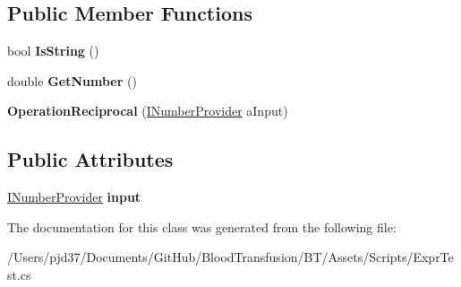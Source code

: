 \subsection*{Public Member Functions}
\begin{DoxyCompactItemize}
\item 
bool {\bfseries Is\+String} ()\hypertarget{class_b83_1_1_logic_expression_parser_1_1_operation_reciprocal_a662ac9f17e951142640d7c84fb229de4}{}\label{class_b83_1_1_logic_expression_parser_1_1_operation_reciprocal_a662ac9f17e951142640d7c84fb229de4}

\item 
double {\bfseries Get\+Number} ()\hypertarget{class_b83_1_1_logic_expression_parser_1_1_operation_reciprocal_afc390a8d14c3cad735f3baf014ab6cf5}{}\label{class_b83_1_1_logic_expression_parser_1_1_operation_reciprocal_afc390a8d14c3cad735f3baf014ab6cf5}

\item 
{\bfseries Operation\+Reciprocal} (\hyperlink{interface_b83_1_1_logic_expression_parser_1_1_i_number_provider}{I\+Number\+Provider} a\+Input)\hypertarget{class_b83_1_1_logic_expression_parser_1_1_operation_reciprocal_a2c6a5228f2d8d9b0f4e71947c413fb9f}{}\label{class_b83_1_1_logic_expression_parser_1_1_operation_reciprocal_a2c6a5228f2d8d9b0f4e71947c413fb9f}

\end{DoxyCompactItemize}
\subsection*{Public Attributes}
\begin{DoxyCompactItemize}
\item 
\hyperlink{interface_b83_1_1_logic_expression_parser_1_1_i_number_provider}{I\+Number\+Provider} {\bfseries input}\hypertarget{class_b83_1_1_logic_expression_parser_1_1_operation_reciprocal_a8c1b6f5ffd6f2228fcf0e63254cfb94a}{}\label{class_b83_1_1_logic_expression_parser_1_1_operation_reciprocal_a8c1b6f5ffd6f2228fcf0e63254cfb94a}

\end{DoxyCompactItemize}


The documentation for this class was generated from the following file\+:\begin{DoxyCompactItemize}
\item 
/\+Users/pjd37/\+Documents/\+Git\+Hub/\+Blood\+Transfusion/\+B\+T/\+Assets/\+Scripts/Expr\+Test.\+cs\end{DoxyCompactItemize}
